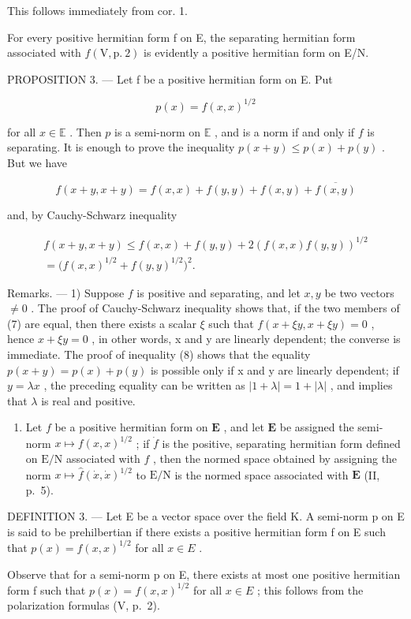 This follows immediately from cor. 1.

For every positive hermitian form f on E, the separating hermitian form associated with \(f(\mathrm{V}, \mathrm{p.~2})\) is evidently a positive hermitian form on E/N.

PROPOSITION 3. --- Let f be a positive hermitian form on E. Put

\[
p (x) = f (x, x) ^ {1 / 2}
\]

for all \(x \in \mathbb{E}\) . Then \(p\) is a semi-norm on \(\mathbb{E}\) , and is a norm if and only if \(f\) is separating. It is enough to prove the inequality \(p(x + y) \leqslant p(x) + p(y)\) . But we have

\[
f (x + y, x + y) = f (x, x) + f (y, y) + f (x, y) + \overline {{f (x , y)}}
\]

and, by Cauchy-Schwarz inequality

\[
\begin{array}{c} f (x + y, x + y) \leqslant f (x, x) + f (y, y) + 2 (f (x, x) f (y, y)) ^ {1 / 2} \\ = \bigl (f (x, x) ^ {1 / 2} + f (y, y) ^ {1 / 2} \bigr) ^ {2}. \end{array}\tag{8}
\]

Remarks. --- 1) Suppose \(f\) is positive and separating, and let \(x, y\) be two vectors \(\neq 0\) . The proof of Cauchy-Schwarz inequality shows that, if the two members of (7) are equal, then there exists a scalar \(\xi\) such that \(f(x + \xi y, x + \xi y) = 0\) , hence \(x + \xi y = 0\) , in other words, x and y are linearly dependent; the converse is immediate. The proof of inequality (8) shows that the equality \(p(x + y) = p(x) + p(y)\) is possible only if x and y are linearly dependent; if \(y = \lambda x\) , the preceding equality can be written as \(|1 + \lambda| = 1 + |\lambda|\) , and implies that \(\lambda\) is real and positive.

\begin{enumerate}
\def\labelenumi{\arabic{enumi})}
\setcounter{enumi}{1}
\tightlist
\item
  Let \(f\) be a positive hermitian form on \(\mathbf{E}\) , and let \(\mathbf{E}\) be assigned the semi-norm \(x \mapsto f(x, x)^{1/2}\) ; if \(\dot{f}\) is the positive, separating hermitian form defined on \(\mathrm{E/N}\) associated with \(f\) , then the normed space obtained by assigning the norm \(x \mapsto \hat{f}(\dot{x}, \dot{x})^{1/2}\) to \(\mathrm{E/N}\) is the normed space associated with \(\mathbf{E}\) (II, p.~5).
\end{enumerate}

DEFINITION 3. --- Let E be a vector space over the field K. A semi-norm p on E is said to be prehilbertian if there exists a positive hermitian form f on E such that \(p(x) = f(x, x)^{1/2}\) for all \(x \in E\) .

Observe that for a semi-norm p on E, there exists at most one positive hermitian form f such that \(p(x) = f(x, x)^{1/2}\) for all \(x \in E\) ; this follows from the polarization formulas (V, p.~2).

